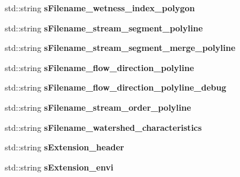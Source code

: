 \begin{DoxyCompactItemize}
\item 
\hypertarget{classhexwatershed_1_1domain_a5ee33e54da314c49081cc5aff85ed2f2}{std\-::string {\bfseries s\-Filename\-\_\-wetness\-\_\-index\-\_\-polygon}}\label{classhexwatershed_1_1domain_a5ee33e54da314c49081cc5aff85ed2f2}

\item 
\hypertarget{classhexwatershed_1_1domain_a9c0a520ad75fcd98931a2b2a0de6bbba}{std\-::string {\bfseries s\-Filename\-\_\-stream\-\_\-segment\-\_\-polyline}}\label{classhexwatershed_1_1domain_a9c0a520ad75fcd98931a2b2a0de6bbba}

\item 
\hypertarget{classhexwatershed_1_1domain_a8fbb658626050e4041a6f055f5db9e50}{std\-::string {\bfseries s\-Filename\-\_\-stream\-\_\-segment\-\_\-merge\-\_\-polyline}}\label{classhexwatershed_1_1domain_a8fbb658626050e4041a6f055f5db9e50}

\item 
\hypertarget{classhexwatershed_1_1domain_a6c6d9ac39299a220605efcf4b6092103}{std\-::string {\bfseries s\-Filename\-\_\-flow\-\_\-direction\-\_\-polyline}}\label{classhexwatershed_1_1domain_a6c6d9ac39299a220605efcf4b6092103}

\item 
\hypertarget{classhexwatershed_1_1domain_a6d9997df868bf85104cb2dacc3b0a074}{std\-::string {\bfseries s\-Filename\-\_\-flow\-\_\-direction\-\_\-polyline\-\_\-debug}}\label{classhexwatershed_1_1domain_a6d9997df868bf85104cb2dacc3b0a074}

\item 
\hypertarget{classhexwatershed_1_1domain_a7dc757b3f0ce86808ab7e2c2ae7a5eb6}{std\-::string {\bfseries s\-Filename\-\_\-stream\-\_\-order\-\_\-polyline}}\label{classhexwatershed_1_1domain_a7dc757b3f0ce86808ab7e2c2ae7a5eb6}

\item 
\hypertarget{classhexwatershed_1_1domain_a951d721abfc639a301a0834231c1bf5d}{std\-::string {\bfseries s\-Filename\-\_\-watershed\-\_\-characteristics}}\label{classhexwatershed_1_1domain_a951d721abfc639a301a0834231c1bf5d}

\item 
\hypertarget{classhexwatershed_1_1domain_a165e26b5807eac0f5cd19ef907fe569b}{std\-::string {\bfseries s\-Extension\-\_\-header}}\label{classhexwatershed_1_1domain_a165e26b5807eac0f5cd19ef907fe569b}

\item 
\hypertarget{classhexwatershed_1_1domain_ab72b24c88c3eaef574931c2d653ee514}{std\-::string {\bfseries s\-Extension\-\_\-envi}}\label{classhexwatershed_1_1domain_ab72b24c88c3eaef574931c2d653ee514}


\end{DoxyCompactItemize}
